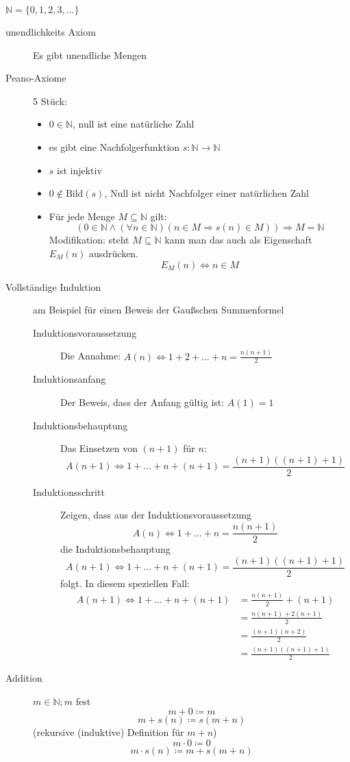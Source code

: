 $\mathbb{N} = \lbrace 0, 1, 2, 3, \dots \rbrace$
\begin{description}
    \item[unendlichkeits Axiom] Es gibt unendliche Mengen
    \item[Peano-Axiome] 5 Stück:
    \begin{itemize}
        \item $0 \in \mathbb{N}$, null ist eine natürliche Zahl
        \item es gibt eine Nachfolgerfunktion $s : \mathbb{N} \longrightarrow \mathbb{N}$
        \item $s$ ist injektiv
        \item $0 \not \in \textrm{Bild}(s)$, Null ist nicht Nachfolger einer natürlichen Zahl
        \item Für jede Menge $M \subseteq \mathbb{N}$ gilt:
        $$(0 \in \mathbb{N} \wedge (\forall n \in \mathbb{N})(n \in M \Rightarrow s(n) \in M)) \Rightarrow M = \mathbb{N}$$
        Modifikation: steht $M \subseteq \mathbb{N}$ kann man das auch als Eigenschaft $E_M(n)$ ausdrücken.
        $$E_M(n) \Leftrightarrow n \in M$$
    \end{itemize}
    \item[Vollständige Induktion] am Beispiel für einen Beweis der Gaußschen Summenformel
    \begin{description}
        \item[Induktionsvoraussetzung] Die Annahme: $A(n) \Leftrightarrow 1 + 2 + \dots + n = \frac{n(n+1)}{2}$
        \item[Induktionsanfang] Der Beweis, dass der Anfang gültig ist: $A(1) = 1$
        \item[Induktionsbehauptung] Das Einsetzen von $(n + 1)$ für $n$:
        $$A(n + 1) \Leftrightarrow 1 + \dots + n + (n + 1)= \frac{(n + 1)((n + 1)+1)}{2}$$
        \item[Induktionsschritt] Zeigen, dass aus der Induktionsvoraussetzung
        $$A(n) \Leftrightarrow 1 + \dots + n = \frac{n(n+1)}{2}$$
        die Induktionsbehauptung
        $$A(n + 1) \Leftrightarrow 1 + \dots + n + (n + 1) = \frac{(n + 1)((n + 1)+1)}{2}$$
        folgt. In diesem speziellen Fall:
        \begin{align*}
            A(n + 1) \Leftrightarrow 1 + \dots + n + (n + 1) & = \frac{n(n + 1)}{2} + (n + 1)  \\
            & = \frac{n(n + 1) + 2(n + 1)}{2} \\
            & = \frac{(n + 1)(n + 2)}{2}      \\
            & = \frac{(n + 1)((n + 1)+1)}{2}
        \end{align*}
    \end{description}
    \item[Addition] $m \in \mathbb{N}; m$ fest
    $$m+0\coloneqq m$$
    $$m + s(n) \coloneqq s(m + n)$$
    (rekursive (induktive) Definition für $m + n$)
    $$m \cdot 0\coloneqq 0$$
    $$m \cdot s(n) \coloneqq m + s(m + n)$$
\end{description}
